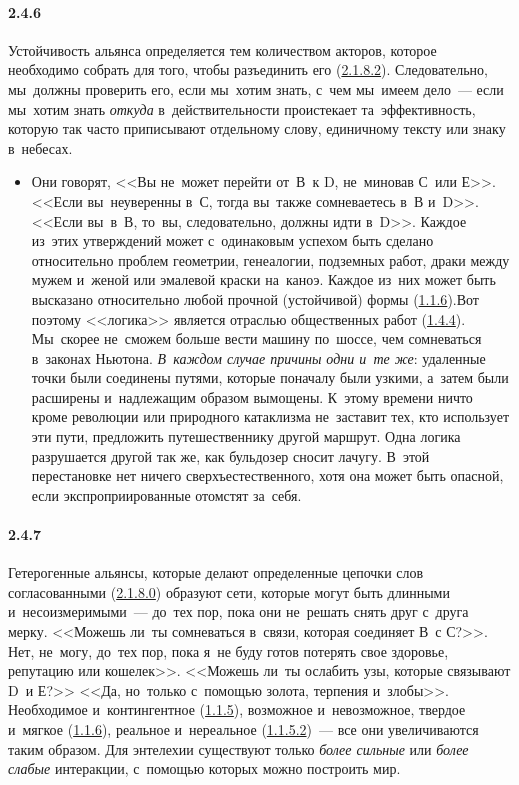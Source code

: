 \paragraph{2.4.6}\hypertarget{par:2.4.6}{} Устойчивость альянса определяется тем количеством акторов, которое необходимо собрать для того, чтобы разъединить его (\hyperlink{par:2.1.8.2}{2.1.8.2}). Следовательно, мы~должны проверить его, если мы~хотим знать, с~чем мы~имеем дело~--- если мы~хотим знать {\itshape откуда} в~действительности проистекает та~эффективность, которую так часто приписывают отдельному слову, единичному тексту или знаку в~небесах.
	\begin{itemize}
	\item 
	Они говорят, <<Вы не~может перейти от~В~к D, не~миновав С~или Е>>. <<Если вы~неуверенны в~С, тогда вы~также сомневаетесь в~В и~D>>. <<Если вы~в~В, то~вы, следовательно, должны идти в~D>>. Каждое из~этих утверждений может с~одинаковым успехом быть сделано относительно проблем геометрии, генеалогии, подземных работ, драки между мужем и~женой или эмалевой краски на~каноэ. Каждое из~них может быть высказано относительно любой прочной (устойчивой) формы (\hyperlink{par:1.1.6}{1.1.6}).Вот поэтому <<логика>> является отраслью общественных работ (\hyperlink{par:1.4.4}{1.4.4}). Мы~скорее не~сможем больше вести машину по~шоссе, чем сомневаться в~законах Ньютона. {\itshape В~каждом случае причины одни и~те же}: удаленные точки были соединены путями, которые поначалу были узкими, а~затем были расширены и~надлежащим образом вымощены. К~этому времени ничто кроме революции или природного катаклизма не~заставит тех, кто использует эти пути, предложить путешественнику другой маршрут. Одна логика разрушается другой так же, как бульдозер сносит лачугу. В~этой перестановке нет ничего сверхъестественного, хотя она может быть опасной, если экспроприированные отомстят за~себя.
	\end{itemize}

\paragraph{2.4.7}\hypertarget{par:2.4.7}{} Гетерогенные альянсы, которые делают определенные цепочки слов согласованными (\hyperlink{par:2.1.8.0}{2.1.8.0}) образуют сети, которые могут быть длинными и~несоизмеримыми~--- до~тех пор, пока они не~решать снять друг с~друга мерку. <<Можешь ли~ты сомневаться в~связи, которая соединяет В~с С?>>. Нет, не~могу, до~тех пор, пока я~не буду готов потерять свое здоровье, репутацию или кошелек>>. <<Можешь ли~ты ослабить узы, которые связывают D~и Е?>> <<Да, но~только с~помощью золота, терпения и~злобы>>. Необходимое и~контингентное (\hyperlink{par:1.1.5}{1.1.5}), возможное и~невозможное, твердое и~мягкое (\hyperlink{par:1.1.6}{1.1.6}), реальное и~нереальное (\hyperlink{par:1.1.5.2}{1.1.5.2})~--- все они увеличиваются таким образом. Для энтелехии существуют только {\itshape более сильные} или {\itshape более слабые} интеракции, с~помощью которых можно построить мир.

